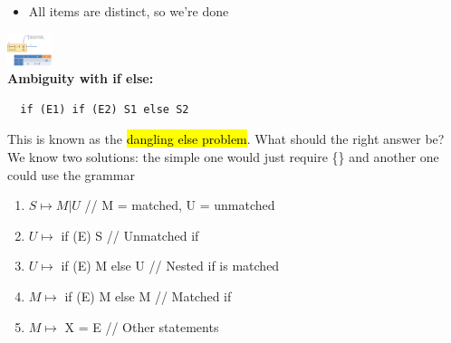 \documentclass[10pt,landscape]{article}
\newcommand{\yellow}[1]{\sethlcolor{yellow} \hl{#1}}
\begin{document}
\begin{multicols}{3}
\begin{itemize}
  \item All items are distinct, so we’re done
\end{itemize}
\includegraphics[width = 0.1\textwidth]{Bilder/dfa_lr1.png} \\
\textbf{Ambiguity with if else:} \begin{verbatim}
  if (E1) if (E2) S1 else S2
\end{verbatim}
This is known as the \yellow{dangling else problem}. What should the right answer be?
We know two solutions: the simple one would just require \{\} and another one could use the grammar
\begin{enumerate}
  \item $S \mapsto M | U$   // M = matched, U = unmatched
  \item $U \mapsto$ if (E) S   // Unmatched if
  \item $U \mapsto$ if (E) M else U  // Nested if is matched
  \item $M \mapsto$ if (E) M else M // Matched if
  \item $M \mapsto$ X = E  // Other statements
\end{enumerate}

\end{multicols}
\end{document}
